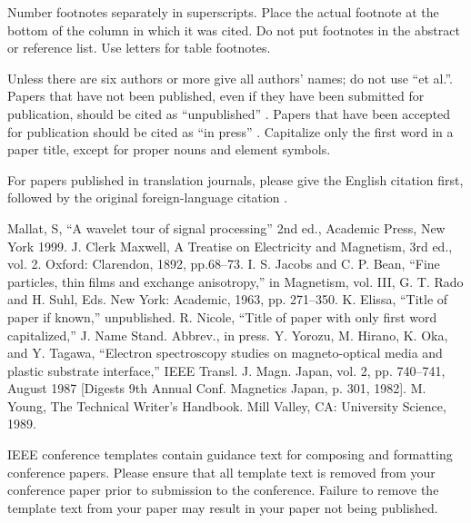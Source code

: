 \documentclass[conference]{IEEEtran}
\begin{document}
Number footnotes separately in superscripts. Place the actual footnote at
the bottom of the column in which it was cited. Do not put footnotes in the
abstract or reference list. Use letters for table footnotes.

Unless there are six authors or more give all authors' names; do not use
``et al.''. Papers that have not been published, even if they have been
submitted for publication, should be cited as ``unpublished'' \cite{b4}. Papers
that have been accepted for publication should be cited as ``in press'' \cite{b5}.
Capitalize only the first word in a paper title, except for proper nouns and
element symbols.

For papers published in translation journals, please give the English
citation first, followed by the original foreign-language citation \cite{b6}.

\begin{thebibliography}{00}
 Mallat, S, ``A wavelet tour of signal processing'' 2nd ed., Academic Press, New York 1999.
 J. Clerk Maxwell, A Treatise on Electricity and Magnetism, 3rd ed., vol. 2. Oxford: Clarendon, 1892, pp.68--73.
 I. S. Jacobs and C. P. Bean, ``Fine particles, thin films and exchange anisotropy,'' in Magnetism, vol. III, G. T. Rado and H. Suhl, Eds. New York: Academic, 1963, pp. 271--350.
 K. Elissa, ``Title of paper if known,'' unpublished.
 R. Nicole, ``Title of paper with only first word capitalized,'' J. Name Stand. Abbrev., in press.
 Y. Yorozu, M. Hirano, K. Oka, and Y. Tagawa, ``Electron spectroscopy studies on magneto-optical media and plastic substrate interface,'' IEEE Transl. J. Magn. Japan, vol. 2, pp. 740--741, August 1987 [Digests 9th Annual Conf. Magnetics Japan, p. 301, 1982].
 M. Young, The Technical Writer's Handbook. Mill Valley, CA: University Science, 1989.
\end{thebibliography}
\vspace{12pt}
\color{red}
IEEE conference templates contain guidance text for composing and formatting conference papers. Please ensure that all template text is removed from your conference paper prior to submission to the conference. Failure to remove the template text from your paper may result in your paper not being published.
\end{document}
